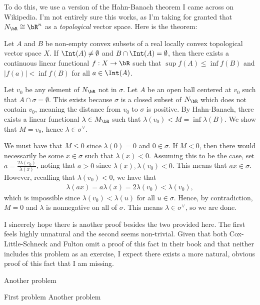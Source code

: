 \begin{homework}[e]
\begin{prf}
		To do this, we use a version of the Hahn-Banach theorem I came across on Wikipedia. I'm not entirely sure this works, as I'm taking for granted that $N_\bR \cong \bR^n$ as a \emph{topological} vector space. Here is the theorem:
		\begin{thm}\label{thm:Hahn-Banach}
			Let $A$ and $B$ be non-empty convex subsets of a real locally convex topological vector space $X$. If $\Int(A) \neq \emptyset$ and $B \cap \Int(A) = \emptyset$, then there exists a continuous linear functional $f:X\to \bR$ such that $\sup f(A) \leq \inf f(B)$ and $|f(a)| < \inf f(B)$ for all $a \in \Int(A)$. 
		\end{thm}
		
		Let $v_0$ be any element of $N_\bR$ not in $\sigma$. Let $A$ be an open ball centered at $v_0$ such that $A \cap \sigma = \emptyset$. This exists because $\sigma$ is a closed subset of $N_\bR$ which does not contain $v_0$, meaning the distance from $v_0$ to $\sigma$ is positive. By Hahn-Banach, there exists a linear functional $\lambda \in M_\bR$ such that $\lambda(v_0) < M = \inf \lambda(B)$. We show that $M = v_0$, hence $\lambda \in \sigma^{\vee}$.

		We must have that $M \leq 0$ since $\lambda(0) = 0$ and $0 \in \sigma$. If $M < 0$, then there would necessarily be some $x \in \sigma$ such that $\lambda(x) < 0$. Assuming this to be the case, set $a = \frac{2\lambda(v_0)}{\lambda(x)}$, noting that $a > 0$ since $\lambda(x), \lambda(v_0) < 0$. This means that $a x \in \sigma$. However, recalling that $\lambda(v_0) < 0$, we have that
		\begin{align*}
			\lambda(ax) = a\lambda(x) = 2\lambda(v_0) < \lambda(v_0),
		\end{align*}
		which is impossible since $\lambda(v_0) < \lambda(u)$ for all $u \in \sigma$. Hence, by contradiction, $M = 0$ and $\lambda$ is nonnegative on all of $\sigma$. This means $\lambda \in \sigma^{\vee}$, so we are done.

		\bigskip

		I sincerely hope there is another proof besides the two provided here. The first feels highly unnatural and the second seems non-trivial. Given that both Cox-Little-Schneck and Fulton omit a proof of this fact in their book and that neither includes this problem as an exercise, I expect there exists a more natural, obvious proof of this fact that I am missing.
	\end{prf}


	 Another problem
\end{homework}

\begin{homework}[e]
	\prob First problem
	 Another problem
\end{homework}


